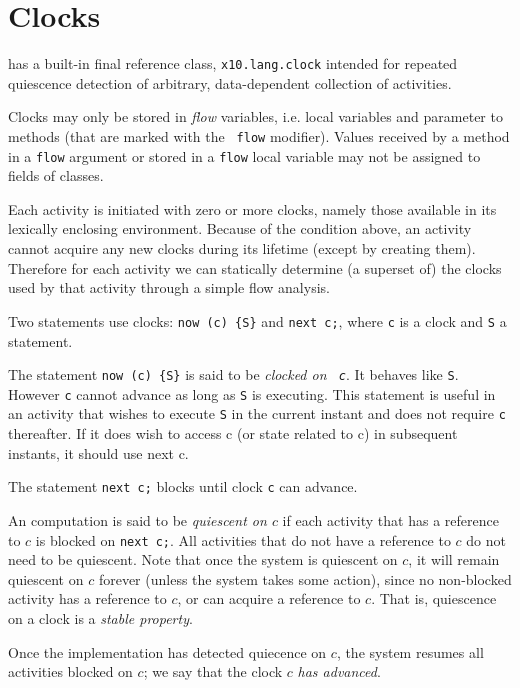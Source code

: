 \section{Clocks}

  has a built-in final reference class, {\tt x10.lang.clock} intended
for repeated quiescence detection of arbitrary, data-dependent
collection of activities.

Clocks may only be stored in {\em flow} variables, i.e.{} local
variables and parameter to methods (that are marked with the {\tt
flow} modifier).  Values received by a method in a {\tt flow} argument
or stored in a {\tt flow} local variable may not be assigned to fields
of classes.

Each activity is initiated with zero or more clocks, namely those
available in its lexically enclosing environment.  Because of the
condition above, an activity cannot acquire any new clocks during its
lifetime (except by creating them). Therefore for each activity we can
statically determine (a superset of) the clocks used by that activity
through a simple flow analysis.


Two statements use clocks: {\tt now (c) \{S\}} and {\tt next c;},
where {\tt c} is a clock and {\tt S} a statement.

The statement {\tt now (c) \{S\}} is said to be {\em clocked on {\tt
c}}. It behaves like {\tt S}. However {\tt c} cannot advance as long
as {\tt S} is executing. This statement is useful in an activity that
wishes to execute {\tt S} in the current instant and does not require
{\tt c} thereafter. If it does wish to access c (or state related to
c) in subsequent instants, it should use next c.

The statement {\tt next c;} blocks until clock {\tt c} can advance.

An  computation is said to be {\em quiescent on $c$} if each
activity that has a reference to $c$ is blocked on {\tt next c;}.
All activities that do not have a reference to $c$ do not need to
be quiescent. Note that once the system is quiescent on $c$, it
will remain quiescent on $c$ forever (unless the system takes some
action), since no non-blocked activity has a reference to $c$,
or can acquire a reference to $c$. That is,  quiescence on 
a clock is a {\em stable property}. 

Once the implementation has detected quiecence on $c$, the system
resumes all activities blocked on $c$; we say that the clock $c$ {\em
has advanced}.

